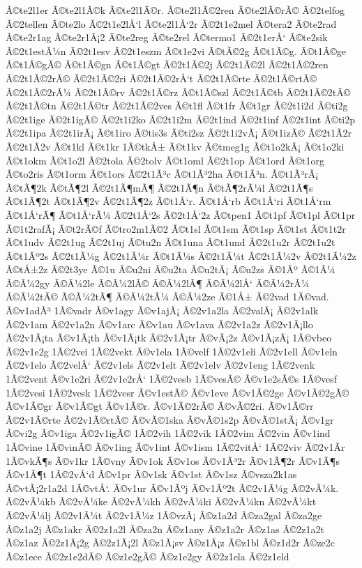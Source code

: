 {Ã©te2l1er
Ã©te2l1Ã©k
Ã©te2l1Ã©r.
Ã©te2l1Ã©2ren
Ã©te2lÃ©rÃ©
Ã©2telfog
Ã©2tellen
Ã©te2lo
Ã©2t1e2lÅ‘l
Ã©te2l1Å‘2r
Ã©2t1e2mel
Ã©tera2
Ã©te2rad
Ã©te2r1ag
Ã©te2r1Ã¡2
Ã©te2reg
Ã©te2rel
Ã©termo1
Ã©2t1erÅ‘
Ã©te2sik
Ã©2t1estÃ¼n
Ã©2t1esv
Ã©2t1eszm
Ã©t1e2vi
Ã©tÃ©2g
Ã©t1Ã©g.
Ã©t1Ã©ge
Ã©t1Ã©gÃ©
Ã©t1Ã©gn
Ã©t1Ã©gt
Ã©2t1Ã©2j
Ã©2t1Ã©2l
Ã©2t1Ã©2ren
Ã©2t1Ã©2rÃ©
Ã©2t1Ã©2ri
Ã©2t1Ã©2rÅ‘t
Ã©2t1Ã©rte
Ã©2t1Ã©rtÃ©
Ã©2t1Ã©2rÃ¼
Ã©2t1Ã©rv
Ã©2t1Ã©rz
Ã©t1Ã©szl
Ã©2t1Ã©tb
Ã©2t1Ã©2tÃ©
Ã©2t1Ã©tn
Ã©2t1Ã©tr
Ã©2t1Ã©2ves
Ã©t1fl
Ã©t1fr
Ã©t1gr
Ã©2t1i2d
Ã©ti2g
Ã©2t1ige
Ã©2t1igÃ©
Ã©2t1i2ko
Ã©2t1i2m
Ã©2t1ind
Ã©2t1inf
Ã©2t1int
Ã©ti2p
Ã©2t1ipa
Ã©2t1irÃ¡
Ã©t1iro
Ã©tis3s
Ã©ti2sz
Ã©2t1i2vÃ¡
Ã©t1izÃ©
Ã©2t1Ã­2r
Ã©2t1Ã­2v
Ã©t1kl
Ã©t1kr
1Ã©tkÅ±
Ã©t1kv
Ã©tmeg1g
Ã©t1o2kÃ¡
Ã©t1o2ki
Ã©t1okm
Ã©t1o2l
Ã©2tola
Ã©2tolv
Ã©t1oml
Ã©2t1op
Ã©t1ord
Ã©t1org
Ã©to2ris
Ã©t1orm
Ã©t1ors
Ã©2t1Ã³c
Ã©t1Ã³2ha
Ã©t1Ã³n.
Ã©t1Ã³rÃ¡
Ã©tÃ¶2k
Ã©tÃ¶2l
Ã©2t1Ã¶mÃ¶
Ã©2t1Ã¶n
Ã©tÃ¶2rÃ¼l
Ã©2t1Ã¶s
Ã©t1Ã¶2t
Ã©t1Ã¶2v
Ã©2t1Ã¶2z
Ã©t1Å‘r.
Ã©t1Å‘rb
Ã©t1Å‘ri
Ã©t1Å‘rm
Ã©t1Å‘rÃ¶
Ã©t1Å‘rÃ¼
Ã©2t1Å‘2s
Ã©2t1Å‘2z
Ã©tpen1
Ã©t1pf
Ã©t1pl
Ã©t1pr
Ã©1t2rafÃ¡
Ã©t2rÃ©f
Ã©tro2m1Ã©2
Ã©t1sl
Ã©t1sm
Ã©t1sp
Ã©t1st
Ã©t1t2r
Ã©t1udv
Ã©2t1ug
Ã©2t1uj
Ã©tu2n
Ã©t1una
Ã©t1und
Ã©2t1u2r
Ã©2t1u2t
Ã©t1Ãº2s
Ã©2t1Ã¼g
Ã©2t1Ã¼r
Ã©t1Ã¼s
Ã©2t1Ã¼t
Ã©2t1Ã¼2v
Ã©2t1Ã¼2z
Ã©tÅ±2z
Ã©2t3ye
Ã©1u
Ã©u2ni
Ã©u2ta
Ã©u2tÃ¡
Ã©u2zs
Ã©1Ãº
Ã©1Ã¼
Ã©Ã¼2gy
Ã©Ã¼2le
Ã©Ã¼2lÃ©
Ã©Ã¼2lÃ¶
Ã©Ã¼2lÅ‘
Ã©Ã¼2rÃ¼
Ã©Ã¼2tÃ©
Ã©Ã¼2tÃ¶
Ã©Ã¼2tÃ¼
Ã©Ã¼2ze
Ã©1Å±
Ã©2vad
1Ã©vad.
Ã©v1adÃ³
1Ã©vadr
Ã©v1agy
Ã©v1ajÃ¡
Ã©2v1a2la
Ã©2valÃ¡
Ã©2v1alk
Ã©2v1am
Ã©2v1a2n
Ã©v1arc
Ã©v1au
Ã©v1ava
Ã©2v1a2z
Ã©2v1Ã¡llo
Ã©2v1Ã¡ta
Ã©v1Ã¡th
Ã©v1Ã¡tk
Ã©2v1Ã¡tr
Ã©vÃ¡2z
Ã©v1Ã¡zÃ¡
1Ã©vbeo
Ã©2v1e2g
1Ã©2vei
1Ã©2vekt
Ã©v1ela
1Ã©velf
1Ã©2v1eli
Ã©2v1ell
Ã©v1eln
Ã©2v1elo
Ã©2velÅ‘
Ã©2v1els
Ã©2v1elt
Ã©2v1elv
Ã©2v1eng
1Ã©2venk
1Ã©2vent
Ã©v1e2ri
Ã©2v1e2rÅ‘
1Ã©2vesb
1Ã©vesÃ©
Ã©v1e2sÃ©s
1Ã©vesf
1Ã©2vesi
1Ã©2vesk
1Ã©2vesr
Ã©v1estÃ©
Ã©v1eve
Ã©v1Ã©2ge
Ã©v1Ã©2gÃ©
Ã©v1Ã©gr
Ã©v1Ã©gt
Ã©v1Ã©r.
Ã©v1Ã©2rÃ©
Ã©vÃ©2ri.
Ã©v1Ã©rr
Ã©2v1Ã©rte
Ã©2v1Ã©rtÃ©
Ã©vÃ©1ska
Ã©vÃ©1s2p
Ã©vÃ©1stÃ¡
Ã©v1gr
Ã©vi2g
Ã©v1iga
Ã©2v1igÃ©
1Ã©2vih
1Ã©2vik
1Ã©2vim
Ã©2vin
Ã©v1ind
1Ã©vine
1Ã©vinÃ©
Ã©v1ing
Ã©v1int
Ã©v1ism
1Ã©2vitÅ‘
1Ã©2viv
Ã©2v1Ã­r
1Ã©vkÃ¶s
Ã©v1kr
1Ã©vny
Ã©v1ok
Ã©v1os
Ã©v1Ã³2r
Ã©v1Ã¶2r
Ã©v1Ã¶s
Ã©v1Ã¶t
1Ã©2vÅ‘d
Ã©v1pr
Ã©v1sk
Ã©v1st
Ã©v1sz
Ã©vsza2k1as
Ã©vtÃ¡2r1a2d
1Ã©vtÅ‘.
Ã©v1ur
Ã©v1Ãºj
Ã©v1Ãº2t
Ã©2v1Ã¼g
Ã©2vÃ¼k.
Ã©2vÃ¼kb
Ã©2vÃ¼ke
Ã©2vÃ¼kh
Ã©2vÃ¼ki
Ã©2vÃ¼kn
Ã©2vÃ¼kt
Ã©2vÃ¼lj
Ã©2v1Ã¼t
Ã©2v1Ã¼z
1Ã©vzÃ¡
Ã©z1a2d
Ã©za2gal
Ã©za2ge
Ã©z1a2j
Ã©z1akr
Ã©2z1a2l
Ã©za2n
Ã©z1any
Ã©z1a2r
Ã©z1as
Ã©2z1a2t
Ã©z1az
Ã©2z1Ã¡2g
Ã©2z1Ã¡2l
Ã©z1Ã¡sv
Ã©z1Ã¡z
Ã©z1bl
Ã©z1d2r
Ã©ze2c
Ã©z1ece
Ã©2z1e2dÃ©
Ã©z1e2gÃ©
Ã©z1e2gy
Ã©2z1ela
Ã©2z1eld
}
